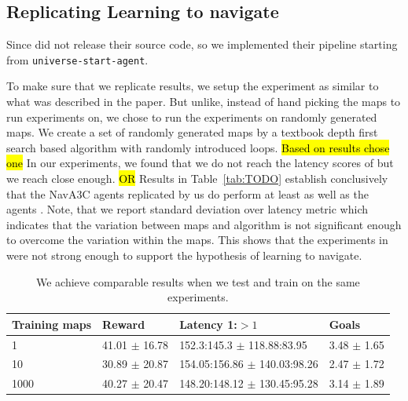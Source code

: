 %

\subsection{Replicating Learning to navigate}

Since \cite{MiPaViICLR2017} did not release their source code, so we implemented their pipeline starting from \texttt{universe-start-agent}\cite{OpenAI2017UniverseStarterAgent}.

To make sure that we replicate \cite{MiPaViICLR2017} results, we setup the experiment as similar to what was described in the paper.
But unlike, \cite{MiPaViICLR2017} instead of hand picking the maps to run experiments on, we chose to run the experiments on randomly generated maps.
We create a set of randomly generated maps by a textbook depth first search based algorithm with randomly introduced loops.
\hl{Based on results chose one}
In our experiments, we found that we do not reach the latency scores of \cite{MiPaViICLR2017} but we reach close enough.
\hl{OR}
Results in Table~\ref{tab:TODO} establish conclusively that the NavA3C agents replicated by us do perform at least as well as the agents .
Note, that we report standard deviation over latency metric which indicates that the variation between maps and algorithm is not significant enough to overcome the variation within the maps.
This shows that the experiments in \cite{MiPaViICLR2017} were not strong enough to support the hypothesis of learning to navigate.

\begin{table}[h]
    \label{sample-table}
    \begin{center}
        \begin{tabular}{llll}
          \toprule
          Training maps & Reward & Latency 1:$>1$ & Goals \\
          \midrule
          1 & 41.01 $\pm$  16.78 & 152.3:145.3 $\pm$ 118.88:83.95 & 3.48 $\pm$ 1.65 \\
          10 & 30.89 $\pm$  20.87 & 154.05:156.86 $\pm$ 140.03:98.26 & 2.47 $\pm$ 1.72 \\
          1000 & 40.27 $\pm$  20.47 & 148.20:148.12 $\pm$ 130.45:95.28 & 3.14 $\pm$ 1.89 \\
          \bottomrule
        \end{tabular}
    \end{center}
    \caption{We achieve comparable results when we test and train on the same experiments.}
\end{table}

